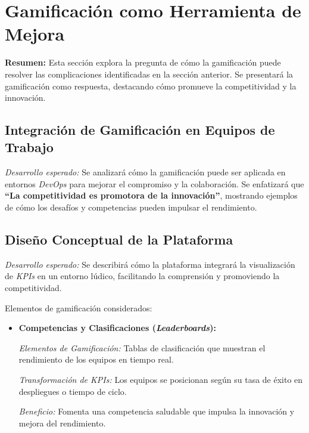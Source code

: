 \documentclass[journal]{IEEEtran}
\begin{document}
\section{\textbf{\Large Gamificación como Herramienta de Mejora}}

\textbf{Resumen:} Esta sección explora la pregunta de cómo la gamificación puede resolver las complicaciones identificadas en la sección anterior. Se presentará la gamificación como respuesta, destacando cómo promueve la competitividad y la innovación.

\subsection{\textbf{Integración de Gamificación en Equipos de Trabajo}}

\textit{Desarrollo esperado:} Se analizará cómo la gamificación puede ser aplicada en entornos \textit{DevOps} para mejorar el compromiso y la colaboración. Se enfatizará que \textbf{``La competitividad es promotora de la innovación''}, mostrando ejemplos de cómo los desafíos y competencias pueden impulsar el rendimiento.

\subsection{\textbf{Diseño Conceptual de la Plataforma}}

\textit{Desarrollo esperado:} Se describirá cómo la plataforma integrará la visualización de \textit{KPIs} en un entorno lúdico, facilitando la comprensión y promoviendo la competitividad.

Elementos de gamificación considerados:

\begin{itemize}
    \item \textbf{Competencias y Clasificaciones (\textit{Leaderboards}):}
    
    \textit{Elementos de Gamificación:} Tablas de clasificación que muestran el rendimiento de los equipos en tiempo real.
    
    \textit{Transformación de \textit{KPIs}:} Los equipos se posicionan según su tasa de éxito en despliegues o tiempo de ciclo.
    
    \textit{Beneficio:} Fomenta una competencia saludable que impulsa la innovación y mejora del rendimiento.
\end{itemize}
\end{document}
